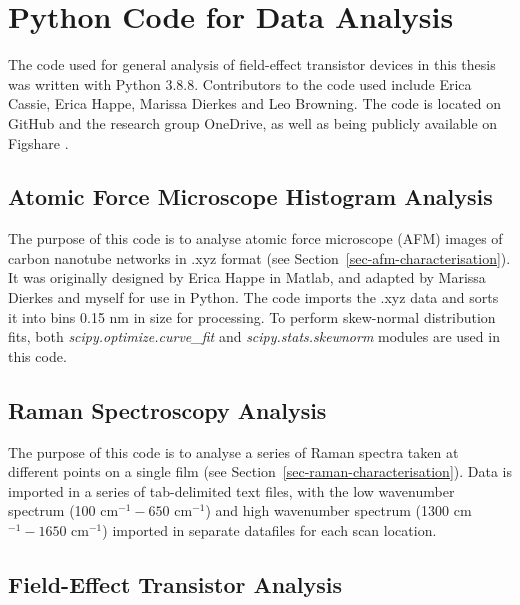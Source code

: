 \documentclass[
  a4paper,
]{scrbook}
\begin{document}
\hypertarget{python-code-for-data-analysis}{%
\chapter{Python Code for Data
Analysis}\label{python-code-for-data-analysis}}

The code used for general analysis of field-effect transistor devices in
this thesis was written with Python 3.8.8. Contributors to the code used
include Erica Cassie, Erica Happe, Marissa Dierkes and Leo Browning. The
code is located on GitHub and the research group OneDrive, as well as
being publicly available on Figshare \autocite{Treacher2024}.

\hypertarget{sec-histogram-analysis}{%
\section{Atomic Force Microscope Histogram
Analysis}\label{sec-histogram-analysis}}

The purpose of this code is to analyse atomic force microscope (AFM)
images of carbon nanotube networks in .xyz format (see
Section~\ref{sec-afm-characterisation}). It was originally designed by
Erica Happe in Matlab, and adapted by Marissa Dierkes and myself for use
in Python. The code imports the .xyz data and sorts it into bins 0.15 nm
in size for processing. To perform skew-normal distribution fits, both
\emph{scipy.optimize.curve\_fit} and \emph{scipy.stats.skewnorm} modules
are used in this code.

\hypertarget{sec-raman-analysis}{%
\section{Raman Spectroscopy Analysis}\label{sec-raman-analysis}}

The purpose of this code is to analyse a series of Raman spectra taken
at different points on a single film (see
Section~\ref{sec-raman-characterisation}). Data is imported in a series
of tab-delimited text files, with the low wavenumber spectrum (100
cm\(^{-1} - 650\) cm\(^{-1}\)) and high wavenumber spectrum (1300
cm\(^{-1} - 1650\) cm\(^{-1}\)) imported in separate datafiles for each
scan location.

\hypertarget{sec-field-effect-transistor-analysis}{%
\section{Field-Effect Transistor
Analysis}\label{sec-field-effect-transistor-analysis}}
\end{document}
